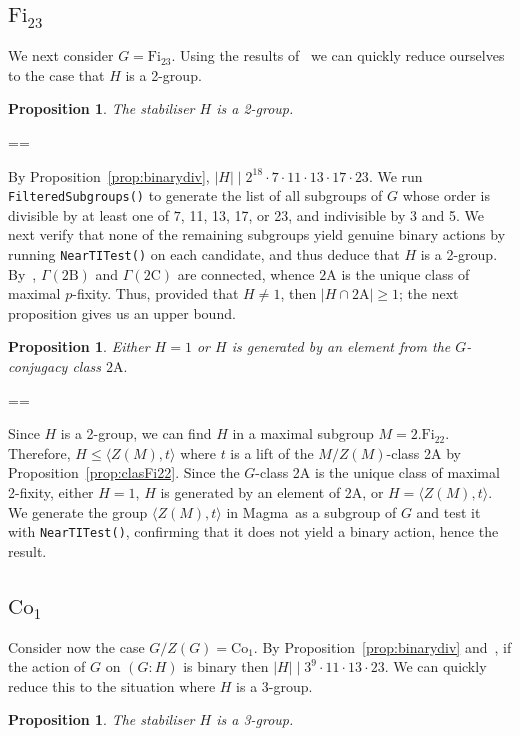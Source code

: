 \documentclass[11pt, a4paper]{amsart}
\makeatletter
\newcommand{\magma}{{\sc Magma}}
\newtheorem{prop}[thm]{Proposition}
\renewcommand{\proofname}{Proof}
\renewenvironment{proof}[1][\proofname]{\par
  \pushQED{\qed}  \normalfont \partopsep=\z@skip \topsep=\z@skip
  \trivlist
  \item[\hskip\labelsep
        \scshape
    #1\@addpunct{.}]\ignorespaces
}{  \popQED\endtrivlist\@endpefalse
}
\makeatother
\begin{document}
\subsection{$\mathrm{Fi}_{23}$}
We next consider $G=\mathrm{Fi}_{23}$. Using the results of~\cite{CDP} we can quickly reduce ourselves to the case that $H$ is a 2-group.

\begin{prop}\label{prop:Fi232group}
    The stabiliser $H$ is a 2-group.
\end{prop}

\begin{proof}
    By Proposition~\ref{prop:binarydiv}, $|H|\mid 2^{18}\cdot7\cdot11\cdot13\cdot17\cdot23$. We run {\tt{FilteredSubgroups()}} to generate the list of all subgroups of $G$ whose order is divisible by at least one of $7$, 11, 13, 17, or 23, and indivisible by 3 and 5. We next verify that none of the remaining subgroups yield genuine binary actions by running {\tt{NearTITest()}} on each candidate, and thus deduce that $H$ is a 2-group.
 \end{proof}
By~\cite[Propositions 3.1, 3.2, and 3.3]{CDP}, $\Gamma(\mathrm{2B})$ and $\Gamma(\mathrm{2C})$ are connected, whence $\mathrm{2A}$ is the unique class of maximal $p$-fixity. Thus, provided that $H\ne 1$, then $|H\cap\mathrm{2A}|\geq 1$; the next proposition gives us an upper bound.
   \begin{prop}\label{prop:fi23clas}
    Either $H=1$ or $H$ is generated by an element from the $G$-conjugacy class $\mathrm{2A}.$
\end{prop}
\begin{proof}
    Since $H$ is a 2-group, we can find $H$ in a maximal subgroup $M=2.\mathrm{Fi}_{22}$. Therefore, $H\leq \langle Z(M),t\rangle$ where $t$ is a lift of the $M/Z(M)$-class 2A by Proposition~\ref{prop:clasFi22}. Since the $G$-class 2A is the unique class of maximal 2-fixity, either $H=1$, $H$ is generated by an element of 2A, or $H=\langle Z(M),t\rangle$. We generate the group $\langle Z(M),t\rangle$ in \magma~as a subgroup of $G$ and test it with {\tt NearTITest()}, confirming that it does not yield a binary action, hence the result.
    \end{proof}

\subsection{$\mathrm{Co}_{1}$} Consider now the case $G/Z(G)=\mathrm{Co}_1$. By Proposition~\ref{prop:binarydiv} and~\cite[Theorem 4.2]{CDP}, if the action of $G$ on $(G:H)$ is binary then $|H|\mid 3^9\cdot11\cdot13\cdot23$. We can quickly reduce this to the situation where $H$ is a 3-group.
\begin{prop}
    The stabiliser $H$ is a 3-group.
\end{prop}
\end{document}

